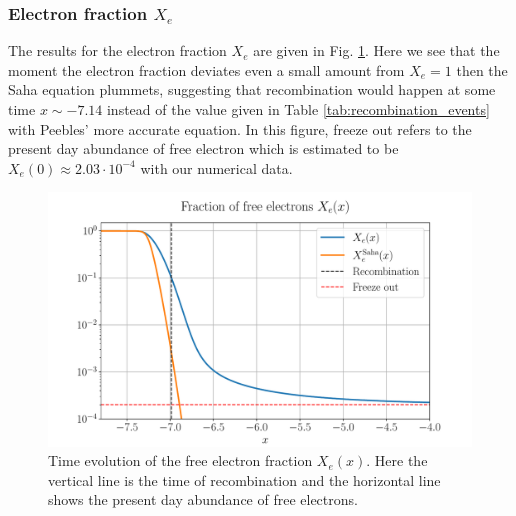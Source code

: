 \documentclass[%
reprint,
 amsmath,amssymb,
 aps,
]{revtex4-2}
\begin{document}
\subsubsection{Electron fraction $X_e$}
The results for the electron fraction $X_e$ are given in Fig. \ref{fig:Xe}. Here we see that the moment the electron fraction deviates even a small amount from $X_e=1$ then the Saha equation plummets, suggesting that recombination would happen at some time $x\sim-7.14$ instead of the value given in Table \ref{tab:recombination_events} with Peebles' more accurate equation. In this figure, freeze out refers to the present day abundance of free electron which is estimated to be $X_e(0)\approx2.03\cdot10^{-4}$ with our numerical data. 
\begin{figure}[ht!]
\includegraphics[width = \linewidth]{Figures/Xe.pdf}
\caption{Time evolution of the free electron fraction $X_e(x)$. Here the vertical line is the time of recombination and the horizontal line shows the present day abundance of free electrons.}
\label{fig:Xe}
\end{figure}
\end{document}
